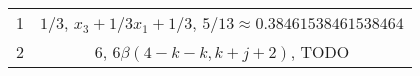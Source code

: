 \documentclass[11pt,oneside,titlepage]{book}
\begin{document}
\begin{tabular}[center]{||c | c|| }
  \hline
  1 & $1/3$,  $x_3 + 1/3 x_1 + 1/3$, $5/13 \approx 0.38461538461538464$\\
  2 & $6$, $6 \beta(4 - k - k, k + j + 2)$, TODO\\
  \hline 
\end{tabular}


\end{document}
